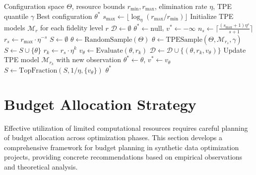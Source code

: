 \begin{algorithm}[htbp]
\caption{BOHB: Bayesian Optimization with Hyperband}
\label{alg:bohb}
\begin{algorithmic}[1]
\Require Configuration space $\Theta$, resource bounds $r_{\min}, r_{\max}$, elimination rate $\eta$, TPE quantile $\gamma$
\Ensure Best configuration $\theta^*$
\State $s_{\max} \gets \lfloor \log_\eta(r_{\max}/r_{\min}) \rfloor$
\State Initialize TPE models $\mathcal{M}_r$ for each fidelity level $r$
\State $\mathcal{D} \gets \emptyset$ 
\State $\theta^* \gets \text{null}$, $v^* \gets -\infty$
        \State $n_s \gets \lceil \frac{(s_{\max}+1) \eta^s}{s+1} \rceil$
        \State $r_s \gets r_{\max} \cdot \eta^{-s}$
        \State $S \gets \emptyset$
                \State $\theta \gets \text{RandomSample}(\Theta)$
            \Else
                \State $\theta \gets \text{TPESample}(\Theta, \mathcal{M}_{r_s}, \gamma)$
            \EndIf
            \State $S \gets S \cup \{\theta\}$
        \EndFor
            \State $r_k \gets r_s \cdot \eta^k$
                \State $v_\theta \gets \text{Evaluate}(\theta, r_k)$
                \State $\mathcal{D} \gets \mathcal{D} \cup \{(\theta, r_k, v_\theta)\}$
                \State Update TPE model $\mathcal{M}_{r_k}$ with new observation
                    \State $\theta^* \gets \theta$, $v^* \gets v_\theta$
                \EndIf
            \EndFor
            \State $S \gets \text{TopFraction}(S, 1/\eta, \{v_\theta\})$
        \EndFor
    \EndFor
\EndWhile
\State \Return $\theta^*$
\end{algorithmic}
\end{algorithm}

\section{Budget Allocation Strategy}
\label{sec:budget_allocation}

Effective utilization of limited computational resources requires careful planning of budget allocation across optimization phases. This section develops a comprehensive framework for budget planning in synthetic data optimization projects, providing concrete recommendations based on empirical observations and theoretical analysis.

